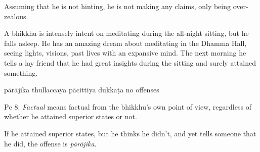 \begin{exam}{\autoExamName}
\begin{problem*}
\begin{parts}
  \begin{solution}
    Assuming that he is not hinting, he is not making any claims, only being over-zealous.
  \end{solution}

  \ifnosolutions
  \bigskip
  \else
  \clearpage
  \fi

  \item A bhikkhu is intensely intent on meditating during the all-night sitting, but he falls asleep. He has an amazing dream about meditating in the Dhamma Hall, seeing lights, visions, past lives with an expansive mind. The next morning he tells a lay friend that he had great insights during the sitting and surely attained something.

  \bigskip

  \begin{answers}{5}
    \bChoices
     pārājika\eAns
     thullaccaya\eAns
     pācittiya\eAns
     dukkaṭa\eAns
     no offenses\eAns
    \eChoices
  \end{answers}

  \begin{solution}
    Pc 8: \emph{Factual} means factual from the bhikkhu's own point of view, regardless of whether he attained superior states or not.

    If he attained superior states, but he thinks he didn't, and yet tells someone that he did, the offense is \emph{pārājika}.
  \end{solution}

  \bigskip

\end{parts}

\end{problem*}

\end{exam}
